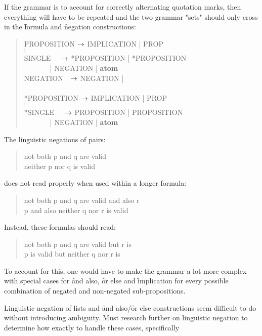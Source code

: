 \documentclass[a4paper]{article}
\begin{document}
If the grammar is to account for correctly alternating quotation marks,
then everything will have to be repeated and the two grammar "sets" should
only cross in the \f{formula} and \f{negation} constructions:
\begin{quote}
\ttfamily
PROPOSITION $\rightarrow$ IMPLICATION | PROP\\
$\vdots$\\
SINGLE \(~~~~~\)$\rightarrow$ *PROPOSITION |
                      *PROPOSITION\\
\(~~~~~~~~~~~~~~~\) | NEGATION | {\bf atom}\\
NEGATION \(~~~\)$\rightarrow$ NEGATION | \\
~\\
*PROPOSITION $\rightarrow$ IMPLICATION | PROP\\
$\vdots$\\
*SINGLE \(~~~~~\)$\rightarrow$ PROPOSITION |
                      PROPOSITION\\
\(~~~~~~~~~~~~~~~\) | NEGATION | {\bf atom}\\
\end{quote}

The linguistic negations of pairs:
\begin{quote}
not both p and q are valid\\
neither p nor q is valid\\
\end{quote}
does not read properly when used within a longer formula:
\begin{quote}
    not both p and q are valid and also r\\
    p and also neither q nor r is valid\\
\end{quote}
Instead, these formulas should read:
\begin{quote}
    not both p and q are valid but r is\\
    p is valid but neither q nor r is
\end{quote}
To account for this, one would have to make the grammar a lot more complex
with special cases for \f{and also}, \f{or else} and \f{implication} for 
every possible combination of negated and non-negated sub-propositions.

Linguistic negation of lists and \f{and also}/\f{or else} constructions
seem difficult to do without introducing ambiguity.
Must research further on linguistic negation to determine how exactly to 
handle these cases, specifically \cite{negation}
\end{document}
